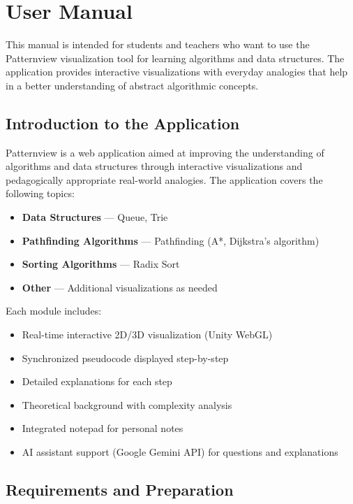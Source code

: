 
\chapter{User Manual}\label{app:user.manual}

This manual is intended for students and teachers who want to use the Patternview visualization tool for learning algorithms and data structures. The application provides interactive visualizations with everyday analogies that help in a better understanding of abstract algorithmic concepts.

\section{Introduction to the Application}

Patternview is a web application aimed at improving the understanding of algorithms and data structures through interactive visualizations and pedagogically appropriate real-world analogies. The application covers the following topics:

\begin{itemize}
  \item \textbf{Data Structures} — Queue, Trie
  \item \textbf{Pathfinding Algorithms} — Pathfinding (A*, Dijkstra's algorithm)
  \item \textbf{Sorting Algorithms} — Radix Sort
  \item \textbf{Other} — Additional visualizations as needed
\end{itemize}

Each module includes:
\begin{itemize}
  \item Real-time interactive 2D/3D visualization (Unity WebGL)
  \item Synchronized pseudocode displayed step-by-step
  \item Detailed explanations for each step
  \item Theoretical background with complexity analysis
  \item Integrated notepad for personal notes
  \item AI assistant support (Google Gemini API) for questions and explanations
\end{itemize}

\section{Requirements and Preparation}

